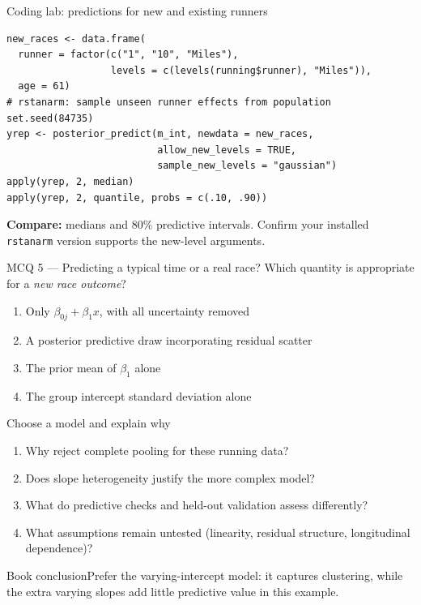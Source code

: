 \documentclass[aspectratio=43,11pt]{beamer}
\newcommand{\stage}[2]{\begin{block}{#1}\small #2\end{block}}
\begin{document}
\begin{frame}[fragile]{Coding lab: predictions for new and existing runners}
\begin{lstlisting}
new_races <- data.frame(
  runner = factor(c("1", "10", "Miles"),
                  levels = c(levels(running$runner), "Miles")),
  age = 61)
# rstanarm: sample unseen runner effects from population
set.seed(84735)
yrep <- posterior_predict(m_int, newdata = new_races,
                          allow_new_levels = TRUE,
                          sample_new_levels = "gaussian")
apply(yrep, 2, median)
apply(yrep, 2, quantile, probs = c(.10, .90))
\end{lstlisting}
\textbf{Compare:} medians and 80\% predictive intervals. Confirm your installed \texttt{rstanarm} version supports the new-level arguments.
\end{frame}

\begin{frame}{MCQ 5 --- Predicting a typical time or a real race?}
Which quantity is appropriate for a \emph{new race outcome}?
\begin{enumerate}
\item[A.] Only $\beta_{0j}+\beta_1x$, with all uncertainty removed
\item[B.] A posterior predictive draw incorporating residual scatter
\item[C.] The prior mean of $\beta_1$ alone
\item[D.] The group intercept standard deviation alone
\end{enumerate}
\end{frame}

\begin{frame}{Choose a model and explain why}
\begin{enumerate}
\item Why reject complete pooling for these running data?
\item Does slope heterogeneity justify the more complex model?
\item What do predictive checks and held-out validation assess differently?
\item What assumptions remain untested (linearity, residual structure, longitudinal dependence)?
\end{enumerate}
\vspace{3mm}\stage{Book conclusion}{Prefer the varying-intercept model: it captures clustering, while the extra varying slopes add little predictive value in this example.}
\end{frame}
\end{document}
